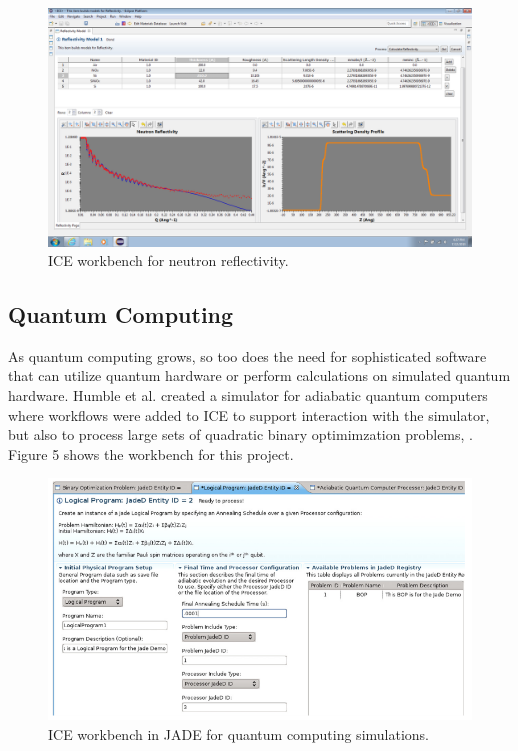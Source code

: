 \begin{figure}[htbp]
\centering
\includegraphics[width=\textwidth]{images/reflectivity-screenshot.png}
\caption{ICE workbench for neutron reflectivity.}
\end{figure}

\subsection{Quantum Computing}\label{quantum-computing}

As quantum computing grows, so too does the need for sophisticated
software that can utilize quantum hardware or perform calculations on
simulated quantum hardware. Humble et al. created a simulator for
adiabatic quantum computers where workflows were added to ICE to support
interaction with the simulator, but also to process large sets of
quadratic binary optimimzation problems, \cite{humble_integrated_2014}. Figure 5
shows the workbench for this project.

\begin{figure}[htbp]
\centering
\includegraphics[width=\textwidth]{images/jaded.png}
\caption{ICE workbench in JADE for quantum computing simulations.}
\end{figure}

